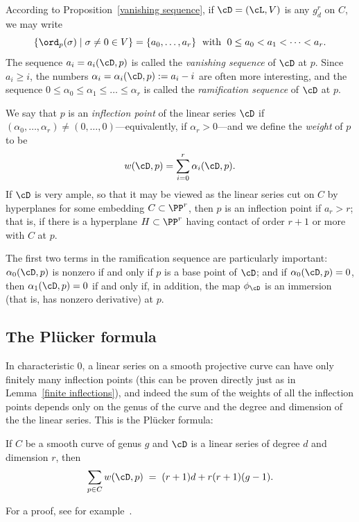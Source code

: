According to  Proposition~\ref{vanishing sequence}, if $\cD = (\cL, V)$ is any $g^r_d$ on $C$, we may write
$$
\{ \ord_p(\sigma) \mid \sigma \neq 0 \in V \} = \{a_0,\dots,a_r\} \; \text{ with } \; 0\leq a_0 < a_1 < \dots < a_r.
$$
The sequence $a_i = a_i(\cD,p)$ is called the \emph{vanishing sequence} of $\cD$ at $p$.  Since $a_i \geq i$, the numbers $\alpha_i = \alpha_i(\cD,p) := a_i - i$ are often more interesting, and the sequence $0 \leq \alpha_0 \leq \alpha_1 \leq \dots \leq \alpha_r$ is called the \emph{ramification sequence} of $\cD$ at $p$. 

We say that $p$ is an \emph{inflection point} of the linear series $\cD$ if $(\alpha_0,\dots,\alpha_r) \neq (0,\dots,0)$---equivalently, if $\alpha_r > 0$---and we define the \emph{weight} of $p$ to be
$$
w(\cD, p) = \sum_{i=0}^r \alpha_i(\cD, p).
$$
If $\cD$ is very ample, so that it may be viewed as the linear series cut on $C$ by hyperplanes for some embedding $C \subset \PP^r$, then $p$ is an inflection point if $a_r > r$; that is, if there is a hyperplane $H \subset \PP^r$ having contact of order $r+1$ or more with $C$ at $p$. 

The first two terms in the ramification sequence are particularly important: $\alpha_0(\cD, p)$ is nonzero if and only if $p$ is a base point of $\cD$; and if $\alpha_0(\cD, p)=0$, then $\alpha_1(\cD, p) = 0$ if and only if, in addition, the map $\phi_\cD$ is an immersion (that is, has nonzero derivative) at $p$.


\subsection{The Pl\"ucker formula}

In characteristic 0, a linear series on a smooth projective curve can have only finitely many inflection points (this can be proven
directly just as in Lemma~\ref{finite inflections}), and indeed the sum of the weights of all the inflection points depends only on the genus of the curve and the degree and dimension of the the linear series. This is the Pl\"ucker formula:

\begin{theorem}\label{Plucker}
If $C$ be a smooth curve of genus $g$ and $\cD$ is a
linear series of degree $d$ and dimension $r$, then
 \begin{equation}\label{Plucker formula}
\sum_{p \in C} w(\cD, p) \; = \; (r+1)d + r(r+1)(g-1).
\end{equation}
\end{theorem}
For a proof, see for example~\cite[Theorem 7.13]{allthat}.

